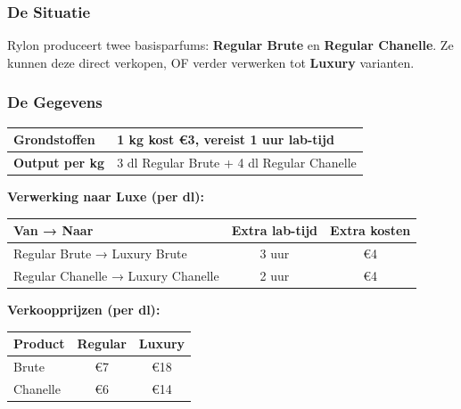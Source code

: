 \documentclass[a4paper,11pt]{article}
\begin{document}
\begin{oefenblok}

    \subsubsection*{De Situatie}
    Rylon produceert twee basisparfums: \textbf{Regular Brute} en \textbf{Regular Chanelle}. Ze kunnen deze direct verkopen, OF verder verwerken tot \textbf{Luxury} varianten.

    \subsubsection*{De Gegevens}

    \begin{center}
        \begin{tabular}{|l|l|}
            \hline
            \textbf{Grondstoffen}  & 1 kg kost €3, vereist 1 uur lab-tijd       \\
            \hline
            \textbf{Output per kg} & 3 dl Regular Brute + 4 dl Regular Chanelle \\
            \hline
        \end{tabular}
    \end{center}

    \medskip
    \noindent\textbf{Verwerking naar Luxe (per dl):}
    \par\medskip
    \begin{center}
        \begin{tabular}{|l|c|c|}
            \hline
            \textbf{Van → Naar}                & \textbf{Extra lab-tijd} & \textbf{Extra kosten} \\
            \hline
            Regular Brute → Luxury Brute       & 3 uur                   & €4                    \\
            \hline
            Regular Chanelle → Luxury Chanelle & 2 uur                   & €4                    \\
            \hline
        \end{tabular}
    \end{center}

    \medskip
    \noindent\textbf{Verkoopprijzen (per dl):}
    \par\medskip
    \begin{center}
        \begin{tabular}{|l|c|c|}
            \hline
            \textbf{Product} & \textbf{Regular} & \textbf{Luxury} \\
            \hline
            Brute            & €7               & €18             \\
            \hline
            Chanelle         & €6               & €14             \\
            \hline
        \end{tabular}
    \end{center}


\end{oefenblok}
\end{document}
